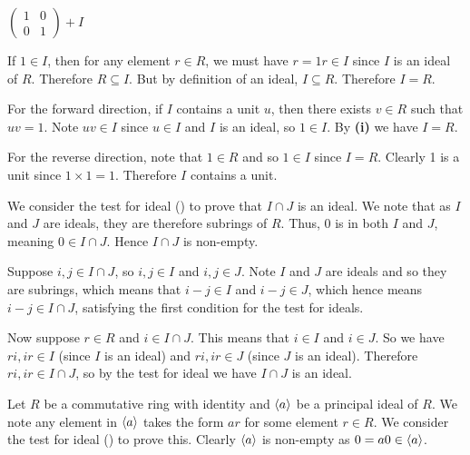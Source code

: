 \begin{questions}
\begin{partquestions}{\roman*}
        \item $\begin{pmatrix}1&0\\0&1\end{pmatrix} + I$
    \end{partquestions}

    \item \begin{partquestions}{\roman*}
        \item If $1 \in I$, then for any element $r \in R$, we must have $r = 1r \in I$ since $I$ is an ideal of $R$. Therefore $R \subseteq I$. But by definition of an ideal, $I \subseteq R$. Therefore $I = R$.

        \item For the forward direction, if $I$ contains a unit $u$, then there exists $v \in R$ such that $uv = 1$. Note $uv \in I$ since $u \in I$ and $I$ is an ideal, so $1 \in I$. By \textbf{(i)} we have $I = R$.

        For the reverse direction, note that $1 \in R$ and so $1 \in I$ since $I = R$. Clearly 1 is a unit since $1\times1 = 1$. Therefore $I$ contains a unit.
    \end{partquestions}

    \item We consider the test for ideal () to prove that $I\cap J$ is an ideal. We note that as $I$ and $J$ are ideals, they are therefore subrings of $R$. Thus, 0 is in both $I$ and $J$, meaning $0 \in I\cap J$. Hence $I\cap J$ is non-empty.

    Suppose $i,j\in I\cap J$, so $i,j \in I$ and $i,j \in J$. Note $I$ and $J$ are ideals and so they are subrings, which means that $i-j \in I$ and $i-j \in J$, which hence means $i-j \in I\cap J$, satisfying the first condition for the test for ideals.

    Now suppose $r \in R$ and $i \in I\cap J$. This means that $i \in I$ and $i \in J$. So we have $ri, ir \in I$ (since $I$ is an ideal) and $ri, ir \in J$ (since $J$ is an ideal). Therefore $ri,ir \in I\cap J$, so by the test for ideal we have $I\cap J$ is an ideal.

    \item Let $R$ be a commutative ring with identity and $\left\langle a\right\rangle$ be a principal ideal of $R$. We note any element in $\left\langle a\right\rangle$ takes the form $ar$ for some element $r \in R$. We consider the test for ideal () to prove this. Clearly $\left\langle a\right\rangle$ is non-empty as $0 = a0 \in \left\langle a\right\rangle$.


\end{questions}
